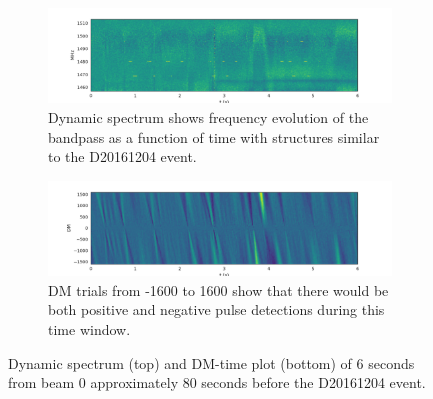 \documentclass[a4paper,fleqn,usenatbib]{mnras}
\begin{document}
\begin{figure}
    \centering
    \begin{subfigure}[t]{1.0\textwidth}
        \centering\captionsetup{width=.95\linewidth}
        \includegraphics[width=1.0\textwidth]{figures/D20161204_spect_buf21_Beam0.pdf}
        \caption{Dynamic spectrum shows frequency evolution of the bandpass as a
        function of time with structures similar to the D20161204 event.
        }
        \label{fig:beam0_dynamic_spec_80s}
    \end{subfigure}
    \begin{subfigure}[t]{1.0\textwidth}
        \centering\captionsetup{width=.95\linewidth}
        \includegraphics[width=1.0\textwidth]{figures/D20161204_dmtrials_buf21_Beam0.pdf}
        \caption{DM trials from -1600 to 1600 show that there would be both
        positive and negative pulse detections during this time window.
        }
        \label{fig:beam0_dmtrials_80s}
    \end{subfigure}
    \caption{Dynamic spectrum (top) and DM-time plot (bottom) of 6 seconds from
    beam 0 approximately 80 seconds before the D20161204 event.
    }
    \label{fig:beamo0_80s}
\end{figure}
\end{document}
